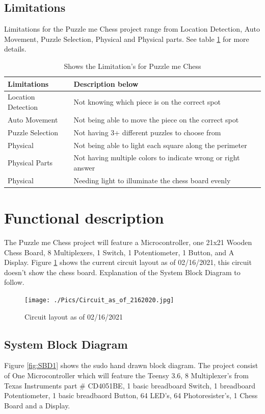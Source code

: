 \documentclass[11pt]{article}
\begin{document}
 
\subsection{Limitations}
Limitations for the Puzzle me Chess project range from Location Detection, Auto Movement, Puzzle Selection, Physical and Physical parts. See table \ref{tab:limitations} for more details.

\begin{table}
\begin{center}
    \begin{tabular}{| l | l |}
    \hline
    Limitations  & Description below\\ \hline
    Location Detection & Not knowing which piece is on the correct spot \\ \hline
    Auto Movement & Not being able to move the piece on the correct spot \\ \hline 
    Puzzle Selection & Not having 3+ different puzzles to choose from  \\ \hline
    Physical & Not being able to light each square along the perimeter  \\ \hline
    Physical Parts & Not having multiple colors to indicate wrong or right answer \\ \hline
    Physical & Needing light to illuminate the chess board evenly \\ \hline
    \end{tabular}
    \caption{Shows the Limitation's for Puzzle me Chess}
	\label{tab:limitations}
\end{center}
\end{table}

\section{Functional description}
The Puzzle me Chess project will feature a Microcontroller, one 21x21 Wooden Chess Board, 8 Multiplexers, 1 Switch, 1 Potentiometer, 1 Button, and A Display. Figure \ref{fig:Circuit} shows  the current circuit layout as of 02/16/2021, this circuit doesn't show the chess board. Explanation of the System Block Diagram to follow.

\begin{figure}
  \texttt{[image: ./Pics/Circuit\_as\_of\_2162020.jpg]}
  \caption{Circuit layout as of 02/16/2021}
  \label{fig:Circuit}
\end{figure}

\subsection{System Block Diagram}
Figure \ref{fig:SBD1} shows the sudo hand drawn block diagram. The project consist of One Microcontroller which will feature the Teensy 3.6, 8 Multiplexer's from Texas Instruments part \# CD4051BE, 1 basic breadboard Switch, 1 breadboard Potentiometer, 1 basic breadbaord Button, 64 LED's, 64 Photoresister's, 1 Chess Board and a Display. 
\\
\end{document}
